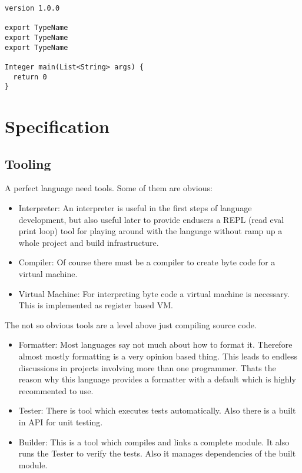 \documentclass[a4paper,12pt]{article}
\begin{document}
\begin{verbatim}
version 1.0.0

export TypeName
export TypeName
export TypeName

Integer main(List<String> args) {
  return 0
}
\end{verbatim}

\section{Specification}

\subsection{Tooling}

A perfect language need tools. Some of them are obvious:

\begin{itemize}
	\item Interpreter: An interpreter is useful in the first steps of language development, but also useful later to provide endusers a REPL (read eval print loop) tool for playing around with the language without ramp up a whole project and build infrastructure.
	\item Compiler: Of course there must be a compiler to create byte code for a virtual machine.
	\item Virtual Machine: For interpreting byte code a virtual machine is necessary. This is implemented as register based VM.
\end{itemize}

The not so obvious tools are a level above just compiling source code.

\begin{itemize}
	\item Formatter: Most languages say not much about how to format it. Therefore almost mostly formatting is a very opinion based thing. This leads to endless discussions in projects involving more than one programmer. Thats the reason why this language provides a formatter with a default which is highly recommented to use.
	\item Tester: There is tool which executes tests automatically. Also there is a built in API for unit testing.
	\item Builder: This is a tool which compiles and links a complete module. It also runs the Tester to verify the tests. Also it manages dependencies of the built module.
\end{itemize}
\end{document}
